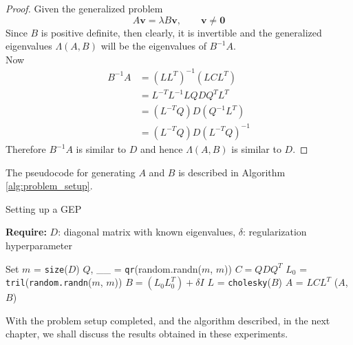 \begin{proof}
	Given the generalized problem
	\begin{equation}
		A \mathbf{v} = \lambda B \mathbf{v}, \qquad \mathbf{v} \neq \mathbf{0}
	\end{equation}
	Since $B$ is positive definite, then clearly, it is invertible and the generalized eigenvalues $\Lambda(A, B)$ will be the eigenvalues of $B^{-1}A$.\\
	Now
	\begin{align*}
		B^{-1}A & = (LL^T)^{-1}(LCL^T)\\
		& = L^{-T}L^{-1}LQDQ^{T}L^T\\
		& = (L^{-T}Q)D(Q^{-1}L^{T}) \\
		& = (L^{-T}Q)D(L^{-T}Q)^{-1}
	\end{align*}
	Therefore $B^{-1}A$ is similar to $D$ and hence $\Lambda(A,B)$ is similar to $D$.
\end{proof}
The pseudocode for generating $A$ and $B$ is described in Algorithm \ref{alg:problem_setup}.
\begin{algorithm}
	\caption{Setting up a GEP}
	\label{alg:problem_setup}
	
	\textbf{Require:} \( D \): diagonal matrix with known eigenvalues, \(\delta\): regularization hyperparameter
	\begin{algorithmic}[1]
		\State Set $m$ = \texttt{size}($D$)
		\State $Q$, \_\_ = \texttt{qr}(random.randn($m$, $m$))
		\State $C = QDQ^T$
		\State $L_{0}$ = \texttt{tril}(\texttt{random.randn}($m$, $m$))
		\State $B = (L_0 L_0^T) + \delta I$
		\State $L$ = \texttt{cholesky}($B$)
		\State $A$ = $LCL^T$
		\State \Return ($A$, $B$)
		\EndFunction
	\end{algorithmic}
\end{algorithm}
With the problem setup completed, and the algorithm described, in the next chapter, we shall discuss the results obtained in these experiments.